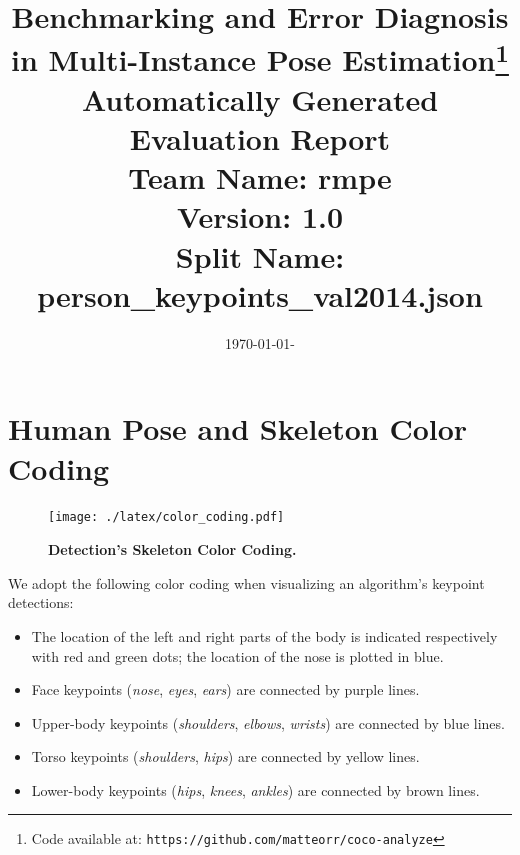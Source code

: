 \documentclass[10pt,onecolumn,letterpaper]{article}
\begin{document}
\title{Benchmarking and Error Diagnosis in Multi-Instance Pose Estimation\footnote{Code available at: \texttt{https://github.com/matteorr/coco-analyze}}\\
Automatically Generated Evaluation Report\\[1.5ex]
\textbf{Team Name:}  rmpe\\[1.5ex]
\textbf{Version:}    1.0\\[1.5ex]
\textbf{Split Name:} person\_keypoints\_val2014.json}
\date{\today - \currenttime}
\maketitle


\section{Human Pose and Skeleton Color Coding}
\begin{figure}
\texttt{[image: ./latex/color\_coding.pdf]}
\caption{ {\small \textbf{Detection's Skeleton Color Coding.}}}
\end{figure}
We adopt the following color coding when visualizing an algorithm's keypoint detections:
\begin{itemize}
    \item The location of the left and right parts of the body is indicated respectively with red and green dots; the location of the nose is plotted in blue.%
    \item Face keypoints (\textit{nose}, \textit{eyes}, \textit{ears}) are connected by purple lines.
    \item Upper-body keypoints (\textit{shoulders}, \textit{elbows}, \textit{wrists}) are connected by blue lines.
    \item Torso keypoints (\textit{shoulders}, \textit{hips}) are connected by yellow lines.
    \item Lower-body keypoints (\textit{hips}, \textit{knees}, \textit{ankles}) are connected by brown lines.
\end{itemize}
\clearpage

\end{document}
